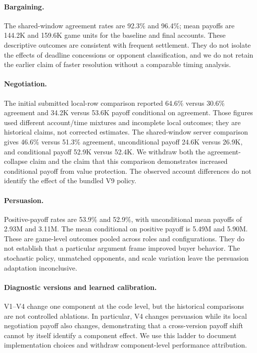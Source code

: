 \documentclass{article}
\begin{document}
\paragraph{Bargaining.}
The shared-window agreement rates are 92.3\% and 96.4\%; mean payoffs are 144.2K and 159.6K game units for the baseline and final accounts. These descriptive outcomes are consistent with frequent settlement. They do not isolate the effects of deadline concessions or opponent classification, and we do not retain the earlier claim of faster resolution without a comparable timing analysis.

\paragraph{Negotiation.}
The initial submitted local-row comparison reported 64.6\% versus 30.6\% agreement and 34.2K versus 53.6K payoff conditional on agreement. Those figures used different account/time mixtures and incomplete local outcomes; they are historical claims, not corrected estimates. The shared-window server comparison gives 46.6\% versus 51.3\% agreement, unconditional payoff 24.6K versus 26.9K, and conditional payoff 52.9K versus 52.4K. We withdraw both the agreement-collapse claim and the claim that this comparison demonstrates increased conditional payoff from value protection. The observed account differences do not identify the effect of the bundled V9 policy.

\paragraph{Persuasion.}
Positive-payoff rates are 53.9\% and 52.9\%, with unconditional mean payoffs of 2.93M and 3.11M. The mean conditional on positive payoff is 5.49M and 5.90M. These are game-level outcomes pooled across roles and configurations. They do not establish that a particular argument frame improved buyer behavior. The stochastic policy, unmatched opponents, and scale variation leave the persuasion adaptation inconclusive.

\paragraph{Diagnostic versions and learned calibration.}
V1--V4 change one component at the code level, but the historical comparisons are not controlled ablations. In particular, V4 changes persuasion while its local negotiation payoff also changes, demonstrating that a cross-version payoff shift cannot by itself identify a component effect. We use this ladder to document implementation choices and withdraw component-level performance attribution.
\end{document}
